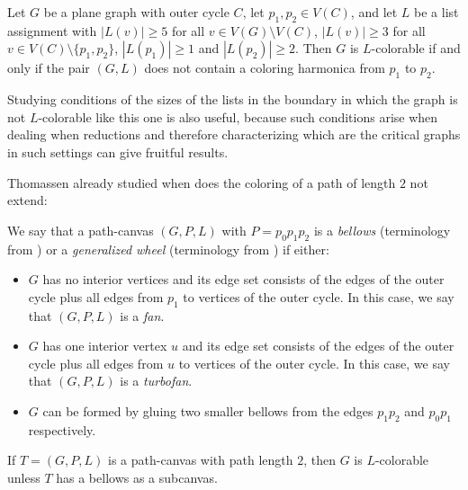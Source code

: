 \begin{theorem}
Let $G$ be a plane graph with outer cycle $C$, let $p_1, p_2 \in V(C)$, and let
$L$ be a list assignment with $|L(v)| \geq 5$ for all $v \in V(G) \setminus V(C)$, $|L(v)| \geq 3$ for all
$v \in V (C) \setminus \{p_1 , p_2\}$, $|L(p_1)| \geq 1$ and $|L(p_2)| \geq 2$. Then $G$ is $L$-colorable if and only if the pair $(G, L)$ does not contain a coloring harmonica from $p_1$ to $p_2$.
\end{theorem}

Studying conditions of the sizes of the lists in the boundary in which the graph is not $L$-colorable like this one is also useful, because such conditions arise when dealing when reductions and therefore characterizing which are the critical graphs in such settings can give fruitful results.

Thomassen already studied when does the coloring of a path of length $2$ not extend:

\begin{definition}[Bellows]
	We say that a path-canvas $(G, P, L)$ with $P = p_0p_1p_2$ is a \emph{bellows} (terminology from \cite{postlethesis}) or a \emph{generalized wheel} (terminology from \cite{thomassenexponentiallymany5listcolorings}) if either:
	\begin{itemize}
		\item $G$ has no interior vertices and its edge set consists of the edges of the outer cycle plus all edges from $p_1$ to vertices of the outer cycle. In this case, we say that $(G, P, L)$ is a \emph{fan}.
		\item $G$ has one interior vertex $u$ and its edge set consists of the edges of the outer cycle plus all edges from $u$ to vertices of the outer cycle. In this case, we say that $(G, P, L)$ is a \emph{turbofan}.
		\item $G$ can be formed by gluing two smaller bellows from the edges $p_1p_2$ and $p_0p_1$ respectively. 
	\end{itemize}
\end{definition}



\begin{theorem}
	If $T = (G, P, L)$ is a path-canvas with path length $2$, then $G$ is $L$-colorable unless $T$ has a bellows as a subcanvas.
\end{theorem}

